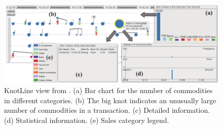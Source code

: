 \documentclass[electronic]{vgtc}             %
\begin{document}
\begin{figure}[htb]
 \centering
 \includegraphics[width=\columnwidth]{KnotLines}
 \caption{KnotLine view from \cite{Xie:2014}. (a) Bar chart for the number of commodities in different categories. (b) The big knot indicates an unusually large number of commodities in a transaction. (c) Detailed information. (d) Statistical information. (e) Sales category legend.
 	}
 \label{fig:knotlines}
\end{figure}
\end{document}
